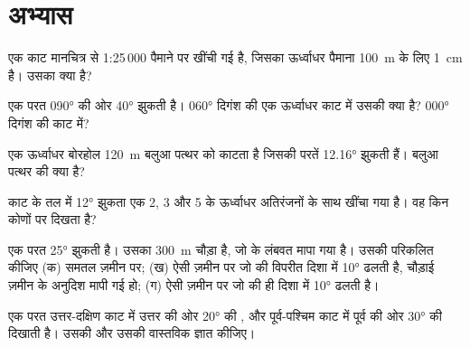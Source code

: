 \section{अभ्यास}

\begin{exercise}[$\star$]\label{exo:b1:cross-sections:1}
एक काट मानचित्र से 1:25\,000 पैमाने पर खींची गई है, जिसका ऊर्ध्वाधर पैमाना \qty{100}{m} के लिए \qty{1}{cm} है। उसका
 क्या है?
\end{exercise}

\begin{exercise}[$\star$]\label{exo:b1:cross-sections:2}
एक परत \ang{090} की ओर \ang{40} झुकती है। \ang{060} दिगंश की एक ऊर्ध्वाधर काट में उसकी  क्या है? \ang{000}
दिगंश की काट में?
\end{exercise}

\begin{exercise}[$\star$]\label{exo:b1:cross-sections:3}
एक ऊर्ध्वाधर बोरहोल \qty{120}{m} बलुआ पत्थर को काटता है जिसकी परतें \ang{12.16} झुकती हैं। बलुआ पत्थर की 
क्या है?
\end{exercise}

\begin{exercise}[$\star$]\label{exo:b1:cross-sections:4}
काट के तल में \ang{12} झुकता एक  2, 3 और 5 के ऊर्ध्वाधर अतिरंजनों के साथ खींचा गया है। वह किन कोणों पर दिखता है?
\end{exercise}

\begin{exercise}[$\star\star$]\label{exo:b1:cross-sections:5}
एक परत \ang{25} झुकती है। उसका  \qty{300}{m} चौड़ा है, जो  के लंबवत मापा गया है। उसकी 
परिकलित कीजिए (क) समतल ज़मीन पर; (ख) ऐसी ज़मीन पर जो  की विपरीत दिशा में \ang{10} ढलती है, चौड़ाई ज़मीन के
अनुदिश मापी गई हो; (ग) ऐसी ज़मीन पर जो  की ही दिशा में \ang{10} ढलती है।
\end{exercise}

\begin{exercise}[$\star\star$]\label{exo:b1:cross-sections:6}
एक परत उत्तर-दक्षिण काट में उत्तर की ओर \ang{20} की , और पूर्व-पश्चिम काट में पूर्व की ओर \ang{30} की
 दिखाती है। उसकी  और उसकी वास्तविक  ज्ञात कीजिए।
\end{exercise}

